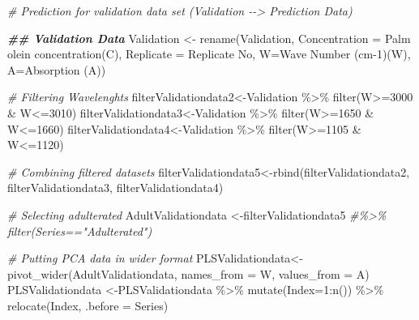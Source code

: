 \documentclass[
]{article}
\newenvironment{Shaded}{\begin{snugshade}}{\end{snugshade}}
\newcommand{\AttributeTok}[1]{\textcolor[rgb]{0.77,0.63,0.00}{#1}}
\newcommand{\CommentTok}[1]{\textcolor[rgb]{0.56,0.35,0.01}{\textit{#1}}}
\newcommand{\DecValTok}[1]{\textcolor[rgb]{0.00,0.00,0.81}{#1}}
\newcommand{\DocumentationTok}[1]{\textcolor[rgb]{0.56,0.35,0.01}{\textbf{\textit{#1}}}}
\newcommand{\FunctionTok}[1]{\textcolor[rgb]{0.00,0.00,0.00}{#1}}
\newcommand{\NormalTok}[1]{#1}
\newcommand{\OtherTok}[1]{\textcolor[rgb]{0.56,0.35,0.01}{#1}}
\newcommand{\SpecialCharTok}[1]{\textcolor[rgb]{0.00,0.00,0.00}{#1}}
\newcommand{\StringTok}[1]{\textcolor[rgb]{0.31,0.60,0.02}{#1}}
\begin{document}
\begin{Shaded}
\begin{Highlighting}[]
  \CommentTok{\# Prediction for validation data set (Validation {-}{-}\textgreater{} Prediction Data)}
  
  \DocumentationTok{\#\# Validation Data }
\NormalTok{  Validation }\OtherTok{\textless{}{-}} \FunctionTok{rename}\NormalTok{(Validation, }\AttributeTok{Concentration =} \StringTok{\textasciigrave{}}\AttributeTok{Palm olein concentration(C)}\StringTok{\textasciigrave{}}\NormalTok{, }
                       \AttributeTok{Replicate =} \StringTok{\textasciigrave{}}\AttributeTok{Replicate No}\StringTok{\textasciigrave{}}\NormalTok{, }\AttributeTok{W=}\StringTok{\textasciigrave{}}\AttributeTok{Wave Number (cm{-}1)(W)}\StringTok{\textasciigrave{}}\NormalTok{, }\AttributeTok{A=}\StringTok{\textasciigrave{}}\AttributeTok{Absorption (A)}\StringTok{\textasciigrave{}}\NormalTok{)}
  
  \CommentTok{\# Filtering Wavelenghts}
\NormalTok{  filterValidationdata2}\OtherTok{\textless{}{-}}\NormalTok{Validation }\SpecialCharTok{\%\textgreater{}\%} \FunctionTok{filter}\NormalTok{(W}\SpecialCharTok{\textgreater{}=}\DecValTok{3000} \SpecialCharTok{\&}\NormalTok{ W}\SpecialCharTok{\textless{}=}\DecValTok{3010}\NormalTok{)}
\NormalTok{  filterValidationdata3}\OtherTok{\textless{}{-}}\NormalTok{Validation }\SpecialCharTok{\%\textgreater{}\%} \FunctionTok{filter}\NormalTok{(W}\SpecialCharTok{\textgreater{}=}\DecValTok{1650} \SpecialCharTok{\&}\NormalTok{ W}\SpecialCharTok{\textless{}=}\DecValTok{1660}\NormalTok{)}
\NormalTok{  filterValidationdata4}\OtherTok{\textless{}{-}}\NormalTok{Validation }\SpecialCharTok{\%\textgreater{}\%} \FunctionTok{filter}\NormalTok{(W}\SpecialCharTok{\textgreater{}=}\DecValTok{1105} \SpecialCharTok{\&}\NormalTok{ W}\SpecialCharTok{\textless{}=}\DecValTok{1120}\NormalTok{)}
  
  \CommentTok{\# Combining filtered datasets}
\NormalTok{  filterValidationdata5}\OtherTok{\textless{}{-}}\FunctionTok{rbind}\NormalTok{(filterValidationdata2, filterValidationdata3, filterValidationdata4) }
  
  \CommentTok{\# Selecting adulterated}
\NormalTok{  AdultValidationdata }\OtherTok{\textless{}{-}}\NormalTok{filterValidationdata5 }\CommentTok{\#\%\textgreater{}\% filter(Series=="Adulterated")}
  
  
  \CommentTok{\# Putting PCA data in wider format}
\NormalTok{  PLSValidationdata}\OtherTok{\textless{}{-}}\FunctionTok{pivot\_wider}\NormalTok{(AdultValidationdata, }\AttributeTok{names\_from =}\NormalTok{ W, }\AttributeTok{values\_from =}\NormalTok{ A)}
\NormalTok{  PLSValidationdata }\OtherTok{\textless{}{-}}\NormalTok{PLSValidationdata }\SpecialCharTok{\%\textgreater{}\%} \FunctionTok{mutate}\NormalTok{(}\AttributeTok{Index=}\DecValTok{1}\SpecialCharTok{:}\FunctionTok{n}\NormalTok{()) }\SpecialCharTok{\%\textgreater{}\%} \FunctionTok{relocate}\NormalTok{(Index, }\AttributeTok{.before =}\NormalTok{ Series)}
  

\end{Highlighting}
\end{Shaded}
\end{document}
